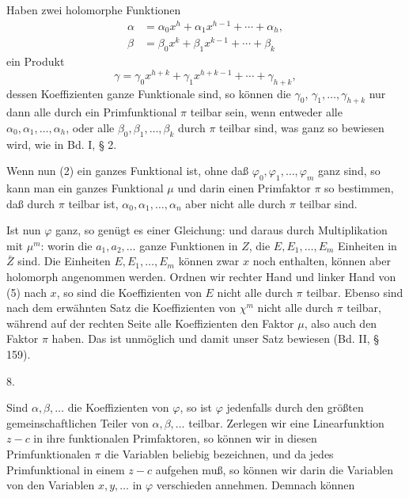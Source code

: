 
Haben zwei holomorphe Funktionen
\[
\begin{aligned}
\alpha &= \alpha_0 x^h + \alpha_1 x^{h-1} + \cdots + \alpha_h, \\
\beta &= \beta_0 x^k + \beta_1 x^{k-1} + \cdots + \beta_k
\end{aligned}
\]
ein Produkt
\[
\gamma = \gamma_0 x^{h+k} + \gamma_1 x^{h+k-1} + \cdots + \gamma_{h+k},
\]
dessen Koeffizienten ganze Funktionale sind, so können die $\gamma_0$,
$\gamma_1, \ldots, \gamma_{h+k}$ nur dann alle durch ein Primfunktional $\pi$ teilbar
sein, wenn entweder alle $\alpha_0, \alpha_1, \ldots, \alpha_h$, oder alle $\beta_0, \beta_1, \ldots, \beta_k$
durch $\pi$ teilbar sind, was ganz so bewiesen wird, wie in Bd. I, § 2.

Wenn nun (2) ein ganzes Funktional ist, ohne daß $\varphi_0, \varphi_1, \ldots, \varphi_m$
ganz sind, so kann man ein ganzes Funktional $\mu$ und darin einen
Primfaktor $\pi$ so bestimmen, daß
durch $\pi$ teilbar ist, $\alpha_0, \alpha_1, \ldots, \alpha_n$ aber nicht alle durch $\pi$ teilbar
sind.

Ist nun $\varphi$ ganz, so genügt es einer Gleichung:
und daraus durch Multiplikation mit $\mu^m$:
worin die $a_1, a_2, \ldots$ ganze Funktionen in $Z$, die $E, E_1, \ldots, E_m$
Einheiten in $\bar{Z}$ sind. Die Einheiten $E, E_1, \ldots, E_m$ können zwar
$x$ noch enthalten, können aber holomorph angenommen werden.
Ordnen wir rechter Hand und linker Hand von (5) nach $x$, so
sind die Koeffizienten von $E$ nicht alle durch $\pi$ teilbar. Ebenso
sind nach dem erwähnten Satz die Koeffizienten von $\chi^m$ nicht
alle durch $\pi$ teilbar, während auf der rechten Seite alle Koeffizienten
 den Faktor $\mu$, also auch den Faktor $\pi$ haben. Das ist
unmöglich und damit unser Satz bewiesen (Bd. II, § 159).

8. 

Sind $\alpha, \beta, \ldots$ die Koeffizienten von $\varphi$, so ist $\varphi$ jedenfalls
durch den größten gemeinschaftlichen Teiler von $\alpha, \beta, \ldots$ teilbar.
Zerlegen wir eine Linearfunktion $z - c$ in ihre funktionalen Primfaktoren,
so können wir in diesen Primfunktionalen $\pi$ die Variablen
beliebig bezeichnen, und da jedes Primfunktional in einem $z - c$
aufgehen muß, so können wir darin die Variablen von den Variablen
 $x, y, \ldots$ in $\varphi$ verschieden annehmen. Demnach können
